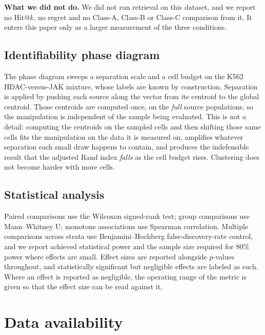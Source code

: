 \documentclass[11pt,letterpaper]{article}
\begin{document}
\textbf{What we did not do.} We did not run retrieval on this dataset, and we report no Hit@$k$,
no regret and no Class-A, Class-B or Class-C comparison from it. It enters this paper only as a
larger measurement of the three conditions.

\subsection*{Identifiability phase diagram}

The phase diagram sweeps a separation scale and a cell budget on the K562 HDAC-versus-JAK
mixture, whose labels are known by construction. Separation is applied by pushing each source
along the vector from its centroid to the global centroid. Those centroids are computed once,
on the \emph{full} source populations, so the manipulation is independent of the sample being
evaluated. This is not a detail: computing the centroids on the sampled cells and then
shifting those same cells fits the manipulation on the data it is measured on, amplifies
whatever separation each small draw happens to contain, and produces the indefensible result
that the adjusted Rand index \emph{falls} as the cell budget rises. Clustering does not become
harder with more cells.

\subsection*{Statistical analysis}

Paired comparisons use the Wilcoxon signed-rank test; group comparisons use Mann--Whitney U;
monotone associations use Spearman correlation. Multiple comparisons across strata use
Benjamini--Hochberg false-discovery-rate control\cite{BenjaminiHochberg}, and we report achieved statistical power and
the sample size required for 80\% power where effects are small. Effect sizes are reported
alongside $p$-values throughout, and statistically significant but negligible effects are
labeled as such. Where an effect is reported as negligible, the operating range of the metric
is given so that the effect size can be read against it.

\section*{Data availability}
\sloppy
\end{document}
